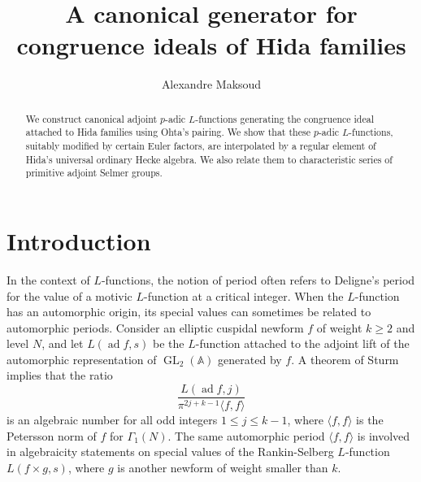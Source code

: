 \documentclass[12pt]{amsart}
\author{Alexandre Maksoud}
\title{A canonical generator for congruence ideals of Hida families}
\newcommand\bA{\mathbb{A}}
\DeclareMathOperator{\ad}{ad}
\DeclareMathOperator{\GL}{GL}
\theoremstyle{defstyle}
\theoremstyle{thmstyle}
\begin{document}
\maketitle
\begin{abstract}
	We construct canonical adjoint $p$-adic $L$-functions generating the congruence ideal attached to Hida families using Ohta's pairing. We show that these $p$-adic $L$-functions, suitably modified by certain Euler factors, are interpolated by a regular element of Hida's universal ordinary Hecke algebra. We also relate them to characteristic series of primitive adjoint Selmer groups.
\end{abstract}
\section{Introduction}
In the context of $L$-functions, the notion of period often refers to Deligne's period for the value of a motivic $L$-function at a critical integer. When the $L$-function has an automorphic origin, its special values can sometimes be related to automorphic periods. Consider an elliptic cuspidal newform $f$ of weight $k\geq 2$ and level $N$, and let $L(\ad f,s)$ be the $L$-function attached to the adjoint lift of the automorphic representation of $\GL_2(\bA)$ generated by $f$. A theorem of Sturm \cite{sturm1980special} implies that the ratio
\begin{equation}\label{eq:intro_symm_square}
	\dfrac{L(\ad f,j)}{\pi^{2j+k-1}\langle f,f\rangle}
\end{equation}
is an algebraic number for all odd integers $1\leq j \leq k-1$, where $\langle f,f\rangle$ is the Petersson norm of $f$ for $\Gamma_1(N)$. The same automorphic period $\langle f,f\rangle$ is involved in algebraicity statements on special values of the Rankin-Selberg $L$-function $L(f\times g,s)$, where $g$ is another newform of weight smaller than $k$.
\end{document}
